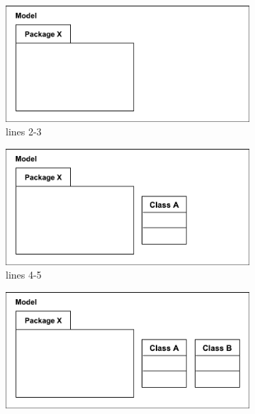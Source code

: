 \documentclass[10pt,conference]{IEEEtran}
\begin{document}
\begin{figure}[ht]
    \begin{subfigure}[t]{0.49\linewidth}
        \centering
        \includegraphics[width=\linewidth]{images/illustration_1}
        \caption{lines 2-3}
        \label{fig:illustration_1}
    \end{subfigure}
    \hfill
    \begin{subfigure}[t]{0.49\linewidth}
        \centering
        \includegraphics[width=\linewidth]{images/illustration_2}
        \caption{lines 4-5}
        \label{fig:illustration_2}
    \end{subfigure}
    \begin{subfigure}[t]{0.49\linewidth}
        \centering
        \includegraphics[width=\linewidth]{images/illustration_3}

\end{subfigure}
\end{figure}
\end{document}
